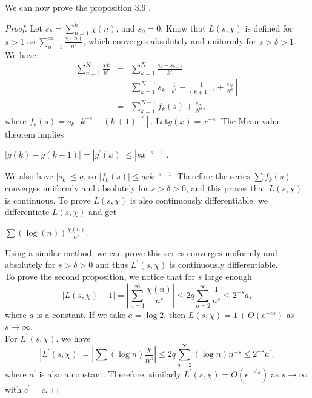 \documentclass[psamsfonts]{amsart}
\theoremstyle{definition}
\theoremstyle{remark}
\numberwithin{equation}{section}
\begin{document}
			We can now prove the proposition 3.6 .
			\begin{proof}
				Let $s_k = \sum_{n=1}^{k} \chi(n)$, and $s_0 = 0$. Know that $L(s,\chi)$ is defined for $s > 1$ as $\sum_{n=1}^{\infty} \frac{\chi(n)}{n^s}$, which converges absolutely and uniformly for $s > \delta > 1$. We have
				\begin{eqnarray}
				\sum_{n=1}^{N} \frac{\chi{k}}{k^s} &=& \sum_{k=1}^{N} \frac{s_k-s_{k-1}}{k^s} \nonumber \\
				&=& \sum_{k=1}^{N-1} s_k\left[\frac{1}{k^s}-\frac{1}{(k+1)^s} + \frac{s_N}{N^s}\right] \nonumber \\
				&=& \sum_{k=1}^{N-1} f_k(s) +\frac{s_N}{N^s},
				\end{eqnarray}
				where $f_k(s) = s_k[k^{-s} - (k+1)^{-s}]$.  Let$g(x) = x^{-s}$. The Mean value theorem implies
				\begin{center}
					$|g(k)-g(k+1)| = |g^{\prime}(x)| \leq |sx^{-s-1}|$.
				\end{center}
				We also have $|s_k| \leq q$, so $|f_k(s)| \leq qsk^{-s-1}$. Therefore the series $\sum {f_k(s)}$ converges uniformly and absolutely for $s > \delta > 0$, and this proves that $L(s,\chi)$ is continuous.
				To prove $L(s,\chi)$ is also continuously differentiable, we differentiate $L(s,\chi)$ and get
				\begin{center}
					$\sum (\log(n)) \frac{\chi(n)}{n^s}$.
				\end{center}
				Using a similar method, we can prove this series converges uniformly and absolutely for $s > \delta >0$ and thus $L^{\prime}(s, \chi)$ is continuously differentiable.\\
				To prove the second proposition, we notice that for $s$ large enough
				\begin{equation}
					|L(s,\chi) - 1| = \left|\sum_{n=1}^{\infty} \frac{\chi(n)}{n^{s}}\right| \leq 2q\sum_{n=2}^{\infty} \frac{1}{n^s} \leq 2^{-s}a,
				\end{equation}
				where $a$ is a constant. If we take $a = \log2$, then $L(s,\chi) = 1 + O(e^{-cs})$ as $s \rightarrow \infty$.\\
				For $L^{\prime}(s,\chi)$, we have
				\begin{equation}
					|L^{\prime}(s,\chi)| = |\sum (\log n) \frac{\chi}{n^s}| \leq 2q\sum_{n=2}^{\infty} (\log n) n^{-s} \leq 2^{-s} a^{\prime},
				\end{equation}
				where $a^{\prime}$ is also a constant. Therefore, similarly $L^{\prime}(s,\chi) = O(e^{-c^{\prime}s})$ as $s \rightarrow \infty$ with $c^{\prime} = c$.
			\end{proof}						
			
\end{document}
